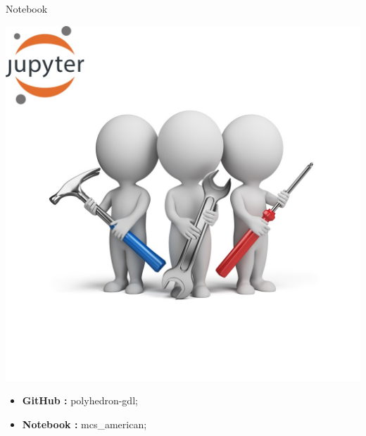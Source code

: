 \documentclass[11pt]{beamer}
\begin{document}
\begin{frame}{Notebook}
\noindent\begin{minipage}{0.5\textwidth}%
\includegraphics[width=\linewidth]{img/exercise.jpg}
\end{minipage}%
\hfill%
\begin{minipage}{0.5\textwidth}
\begin{itemize}
\item {\bf GitHub        : }    polyhedron-gdl;
\item {\bf Notebook   : }    mcs\_american;
\end{itemize}
\end{minipage}
\end{frame}
\end{document}
